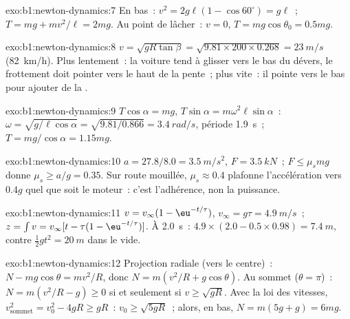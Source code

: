 \begin{solution}{exo:b1:newton-dynamics:7}
En bas~: $v^2 = 2g\ell(1 - \cos 60^\circ) = g\ell$~; $T = mg + mv^2/\ell =
2mg$. Au point de lâcher~: $v = 0$, $T = mg\cos\theta_0 = 0.5mg$.
\end{solution}

\begin{solution}{exo:b1:newton-dynamics:8}
$v = \sqrt{gR\tan\beta} = \sqrt{9.81 \times 200 \times 0.268} = \qty{23}{m/s}$
(\qty{82}{km/h}). Plus lentement~: la voiture tend à glisser vers le bas
du dévers, le frottement doit pointer vers le haut de la pente~; plus
vite~: il pointe vers le bas pour ajouter de la .
\end{solution}

\begin{solution}{exo:b1:newton-dynamics:9}
$T\cos\alpha = mg$, $T\sin\alpha = m\omega^2\ell\sin\alpha$~: $\omega =
\sqrt{g/\ell\cos\alpha} = \sqrt{9.81/0.866} = \qty{3.4}{rad/s}$, période
\qty{1.9}{s}~; $T = mg/\cos\alpha = 1.15mg$.
\end{solution}

\begin{solution}{exo:b1:newton-dynamics:10}
$a = 27.8/8.0 = \qty{3.5}{m/s^2}$, $F = \qty{3.5}{kN}$~; $F \leq \mu_smg$
donne $\mu_s \geq a/g = 0.35$. Sur route mouillée, $\mu_s \approx 0.4$
plafonne l'accélération vers $0.4g$ quel que soit le moteur~:
c'est l'adhérence, non la puissance.
\end{solution}

\begin{solution}{exo:b1:newton-dynamics:11}
$v = v_\infty(1 - \eu^{-t/\tau})$, $v_\infty = g\tau = \qty{4.9}{m/s}$~;
$z = \int v = v_\infty[t - \tau(1 - \eu^{-t/\tau})]$. À \qty{2.0}{s}~:
$4.9 \times (2.0 - 0.5 \times 0.98) = \qty{7.4}{m}$, contre $\tfrac12 gt^2
= \qty{20}{m}$ dans le vide.
\end{solution}

\begin{solution}{exo:b1:newton-dynamics:12}
Projection radiale (vers le centre)~: $N - mg\cos\theta = mv^2/R$, donc
$N = m(v^2/R + g\cos\theta)$. Au sommet ($\theta = \pi$)~: $N = m(v^2/R - g)
\geq 0$ si et seulement si $v \geq \sqrt{gR}$. Avec la loi des vitesses, $v_{\text{sommet}}^2 =
v_0^2 - 4gR \geq gR$~: $v_0 \geq \sqrt{5gR}$~; alors, en bas, $N =
m(5g + g) = 6mg$.
\end{solution}

